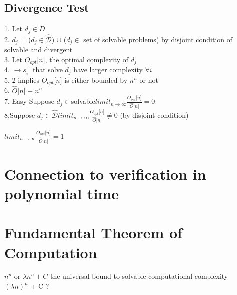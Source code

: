 \documentclass[11pt]{article}
\begin{document}
\subsection{Divergence Test}
1. Let $d_j \in D$\\
2. $d_j$ = ($d_j \in \hat{\mathcal{D}}$) $\cup$ ($d_j \in$ set of solvable problems) by disjoint condition of solvable and divergent\\
3. Let $O_{opt}\lbrack n \rbrack$, the optimal complexity of $d_j$\\
4. $\rightarrow s_i^{+}$ that solve $d_j$ have larger complexity $\forall i$\\
5. 2 implies  $O_{opt}\lbrack n \rbrack$ is either bounded by $n^n$ or not\\
6. $\hat{O} \lbrack n \rbrack \equiv n^n$\\
7. Easy Suppose $d_j\in $solvable$ limit_{n \rightarrow \infty}\frac{O_{opt}\lbrack n \rbrack}{\hat{O}\lbrack n \rbrack} = 0 $\\
8.Suppose $d_j\in \hat{\mathcal{D}} limit_{n \rightarrow \infty}\frac{O_{opt}\lbrack n \rbrack}{\hat{O}\lbrack n \rbrack} \neq 0 $ (by disjoint condition)\\
\begin{center}
$
 limit_{n \rightarrow \infty}\frac{O_{opt}\lbrack n \rbrack}{\hat{O}\lbrack n \rbrack} = 1 
$
\end{center}




\section{Connection to verification in polynomial time}






\newpage


\section{Fundamental Theorem of Computation}
$n^n$ or $\lambda n^n + C$ the universal bound to solvable computational complexity\\
$(\lambda n)^n$ + C ?\\
\end{document}
